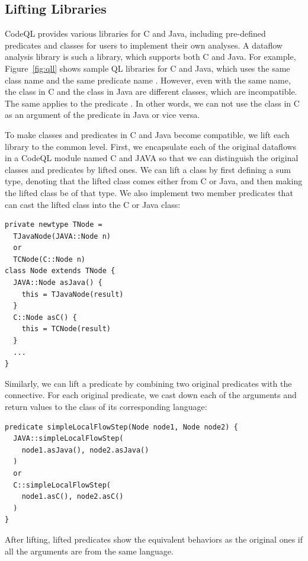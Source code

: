 \subsection{Lifting Libraries}

CodeQL provides various libraries for C and Java, including
pre-defined predicates and classes for users to implement their own analyses.
A dataflow analysis library is such a library, which supports both C and Java.
For example, Figure~\ref{fig:qll} shows sample QL libraries for C and Java,
which uses the same class name  and the same predicate
name .
However, even with the same name, the class  in C and the
class  in Java are different classes, which are incompatible.
The same applies to the predicate .
In other words, we can not use the class  in C as an
argument of the predicate  in Java or vice versa.

To make classes and predicates in C and Java become compatible,
we lift each library to the common level.
First, we encapsulate each of the original dataflows in a CodeQL
module named C and JAVA so that we can distinguish the original
classes and predicates by lifted ones.
We can lift a class by first defining a sum type, denoting that
the lifted class comes either from C or Java, and then making the
lifted class be of that type.  We also implement two member predicates
that can cast the lifted class into the C or Java class:
\begin{lstlisting}[style=codeql,xleftmargin=2.5em]
private newtype TNode =
  TJavaNode(JAVA::Node n)
  or
  TCNode(C::Node n)
class Node extends TNode {
  JAVA::Node asJava() {
    this = TJavaNode(result)
  }
  C::Node asC() {
    this = TCNode(result)
  }
  ...
}
\end{lstlisting}
Similarly, we can lift a predicate by combining two original predicates with
the  connective. For each original predicate, we cast down
each of the arguments and return values to the class of its corresponding language:
\begin{lstlisting}[style=codeql,xleftmargin=2.5em]
predicate simpleLocalFlowStep(Node node1, Node node2) {
  JAVA::simpleLocalFlowStep(
    node1.asJava(), node2.asJava()
  )
  or
  C::simpleLocalFlowStep(
    node1.asC(), node2.asC()
  )
}
\end{lstlisting}
After lifting, lifted predicates show the equivalent behaviors as the
original ones if all the arguments are from the same language.

